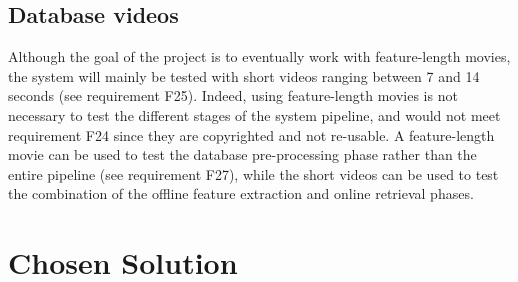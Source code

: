 
\subsection{Database videos}

Although the goal of the project is to eventually work with feature-length movies, the system will mainly be tested with short videos ranging between 7 and 14 seconds (see requirement F25). Indeed, using feature-length movies is not necessary to test the different stages of the system pipeline, and would not meet requirement F24 since they are copyrighted and not re-usable. A feature-length movie can be used to test the database pre-processing phase rather than the entire pipeline (see requirement F27), while the short videos can be used to test the combination of the offline feature extraction and online retrieval phases.


\section{Chosen Solution}

